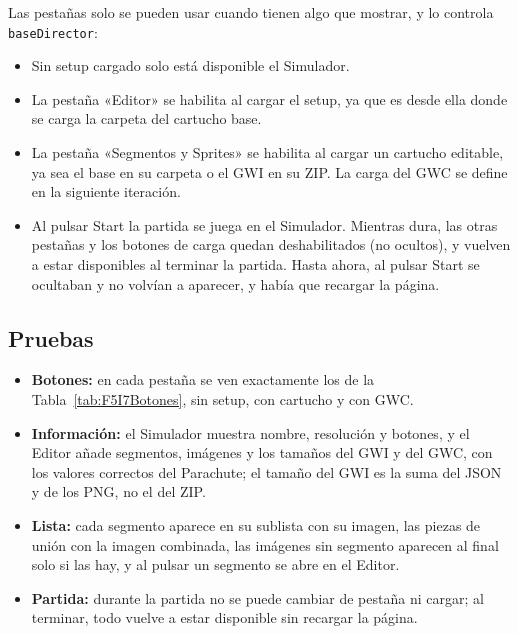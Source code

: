 Las pestañas solo se pueden usar cuando tienen algo que mostrar, y lo
controla \texttt{baseDirector}:

\begin{itemize}
	\item Sin setup cargado solo está disponible el Simulador.
	
	\item La pestaña «Editor» se habilita al cargar el setup, ya que es
	desde ella donde se carga la carpeta del cartucho base.

	\item La pestaña «Segmentos y Sprites» se habilita al cargar un
	cartucho editable, ya sea el base en su carpeta o el GWI en su ZIP.
	La carga del GWC se define en la siguiente iteración.
	
	\item Al pulsar Start la partida se juega en el Simulador. Mientras
	dura, las otras pestañas y los botones de carga quedan
	deshabilitados (no ocultos), y vuelven a estar disponibles al
	terminar la partida. Hasta ahora, al pulsar Start se ocultaban y no volvían a
	aparecer, y había que recargar la página.
\end{itemize}


\subsection{Pruebas}
\label{sec:F5I7Pruebas}

\begin{itemize}
	\item \textbf{Botones:} en cada pestaña se ven exactamente los de la
	Tabla~\ref{tab:F5I7Botones}, sin setup, con cartucho y con GWC.
	
	\item \textbf{Información:} el Simulador muestra nombre, resolución
	y botones, y el Editor añade segmentos, imágenes y los tamaños del
	GWI y del GWC, con los valores correctos del Parachute; el tamaño
	del GWI es la suma del JSON y de los PNG, no el del ZIP.

	\item \textbf{Lista:} cada segmento aparece en su sublista con su
	imagen, las piezas de unión con la imagen combinada, las imágenes
	sin segmento aparecen al final solo si las hay, y al pulsar un
	segmento se abre en el Editor.
	
	\item \textbf{Partida:} durante la partida no se puede cambiar de
	pestaña ni cargar; al terminar, todo vuelve a estar disponible sin
	recargar la página.
\end{itemize}

